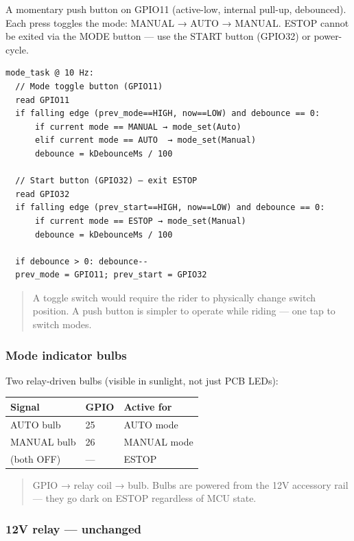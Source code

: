 A momentary push button on GPIO11 (active-low, internal pull-up, debounced).
Each press toggles the mode: MANUAL → AUTO → MANUAL. ESTOP cannot be exited via
the MODE button --- use the START button (GPIO32) or power-cycle.

\begin{verbatim}
mode_task @ 10 Hz:
  // Mode toggle button (GPIO11)
  read GPIO11
  if falling edge (prev_mode==HIGH, now==LOW) and debounce == 0:
      if current mode == MANUAL → mode_set(Auto)
      elif current mode == AUTO  → mode_set(Manual)
      debounce = kDebounceMs / 100

  // Start button (GPIO32) — exit ESTOP
  read GPIO32
  if falling edge (prev_start==HIGH, now==LOW) and debounce == 0:
      if current mode == ESTOP → mode_set(Manual)
      debounce = kDebounceMs / 100

  if debounce > 0: debounce--
  prev_mode = GPIO11; prev_start = GPIO32
\end{verbatim}

\begin{quote}
A toggle switch would require the rider to physically change switch position. A
push button is simpler to operate while riding --- one tap to switch modes.
\end{quote}

\subsubsection{Mode indicator bulbs}\label{mode-indicator-bulbs}

Two relay-driven bulbs (visible in sunlight, not just PCB LEDs):

\begin{longtable}[]{@{}lll@{}}
\toprule\noalign{}
Signal & GPIO & Active for \\
\midrule\noalign{}
\endhead
\bottomrule\noalign{}
\endlastfoot
AUTO bulb & 25 & AUTO mode \\
MANUAL bulb & 26 & MANUAL mode \\
(both OFF) & --- & ESTOP \\
\end{longtable}

\begin{quote}
GPIO → relay coil → bulb. Bulbs are powered from the 12V accessory rail --- they
go dark on ESTOP regardless of MCU state.
\end{quote}

\subsubsection{12V relay --- unchanged}\label{v-relay-unchanged}

